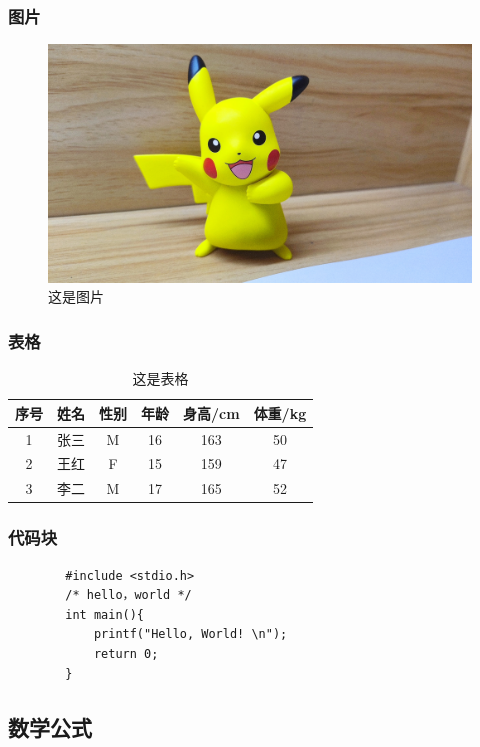 \begin{ujnbody}
    \subsubsection{图片}
    \begin{figure}[htbp]
        \centering
        \includegraphics[scale=0.1]{figures/pikachu.jpg}
        \caption{这是图片}
        \label{fig:2}
    \end{figure}
    \subsubsection{表格}
    \begin{table}[!htbp]
        \centering
        \caption{这是表格}
        \begin{tabular}{cccccc}
            \toprule
            序号 & 姓名 & 性别 & 年龄 & 身高/cm & 体重/kg \\
            \midrule
            1 & 张三 & M & 16 & 163 & 50 \\
            2 & 王红 & F & 15 & 159 & 47 \\
            3 & 李二 & M & 17 & 165 & 52 \\
            \bottomrule
        \end{tabular}
        \label{tab:2}
    \end{table}
    \subsubsection{代码块}
    \begin{lstlisting}
        #include <stdio.h>
        /* hello，world */
        int main(){
            printf("Hello, World! \n"); 
            return 0;
        }
    \end{lstlisting}
    \subsection{数学公式}

\end{ujnbody}
